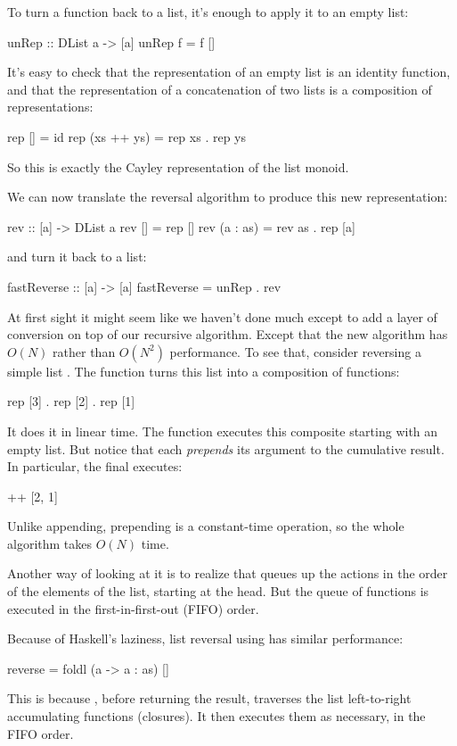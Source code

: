 \documentclass[DaoFP]{subfiles}
\begin{document}
To turn a function back to a list, it's enough to apply it to an empty list:
\begin{haskell}
unRep :: DList a -> [a]
unRep f = f []
\end{haskell}
It's easy to check that the representation of an empty list is an identity function, and that the representation of a concatenation of two lists is a composition of representations:
\begin{haskell}
rep [] = id
rep (xs ++ ys) = rep xs . rep ys
\end{haskell}
So this is exactly the Cayley representation of the list monoid.

We can now translate the reversal algorithm to produce this new representation:
\begin{haskell}
rev :: [a] -> DList a
rev [] = rep []
rev (a : as) = rev as . rep [a]
\end{haskell}
and turn it back to a list:
\begin{haskell}
fastReverse :: [a] -> [a]
fastReverse = unRep . rev
\end{haskell}
At first sight it might seem like we haven't done much except to add a layer of conversion on top of our recursive algorithm. Except that the new algorithm has $O(N)$ rather than $O(N^2)$ performance. To see that, consider reversing a simple list \hask{[1, 2, 3]}. The function  turns this list into a composition of functions:
\begin{haskell}
 rep [3] . rep [2] . rep [1]
\end{haskell}
It does it in linear time. The function  executes this composite starting with an empty list. But notice that each  \emph{prepends} its argument to the cumulative result. In particular, the final  executes:
\begin{haskell}
 [3] ++ [2, 1]
\end{haskell}
Unlike appending, prepending is a constant-time operation, so the whole algorithm takes $O(N)$ time. 

Another way of looking at it is to realize that  queues up the actions in the order of the elements of the list, starting at the head. But the queue of functions is executed in the first-in-first-out (FIFO) order. 

Because of Haskell's laziness, list reversal using  has similar performance:
\begin{haskell}
reverse = foldl (\as a -> a : as) []
\end{haskell}
This is because , before returning the result, traverses the list left-to-right accumulating functions (closures). It then executes them as necessary, in the FIFO order.
\end{document}

